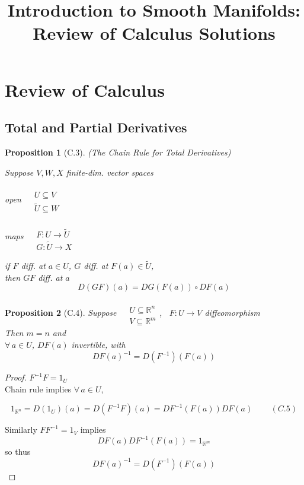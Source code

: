 \documentclass[11pt]{amsart}
\title{Introduction to Smooth Manifolds: Review of Calculus Solutions}
\newtheorem{proposition}{Proposition}
\theoremstyle{definition}
\begin{document}
\maketitle
\section{Review of Calculus}

\subsection*{Total and Partial Derivatives}

\begin{proposition}[C.3] (The Chain Rule for Total Derivatives)

Suppose $V,W,X$ finite-dim. vector spaces

open $\begin{aligned}
  & \quad \\
  & U \subseteq V \\
  & \widetilde{U} \subseteq W \end{aligned}$

maps $\begin{aligned}
  & \quad \\
  & F : U \to \widetilde{U} \\
  & G: \widetilde{U} \to X \end{aligned}$

if $F$ diff. at $a\in U$, $G$ diff. at $F(a) \in \widetilde{U}$, \\
\phantom{ \quad } then $GF$ diff. at $a$
\[
D(GF)(a) = DG(F(a)) \circ DF(a)
\]
\end{proposition}

\begin{proposition}[C.4] Suppose $\begin{aligned}
    & \quad \\
    & U \subseteq \mathbb{R}^n \\
    & V\subseteq \mathbb{R}^m \end{aligned}$, \quad \, $F: U \to V$ diffeomorphism \\
Then $m=n$ and \\
\phantom{ \quad } $\forall \, a \in U$, $DF(a)$ invertible, with
\[
DF(a)^{-1} = D(F^{-1})(F(a))
\]
\end{proposition}

\begin{proof}
$F^{-1}F = 1_U$  \\
Chain rule implies $\forall \, a \in U$,

\begin{equation}
  1_{\mathbb{R}^n} = D(1_U)(a) = D(F^{-1}F)(a) = DF^{-1}(F(a))DF(a) \quad \quad \, (C.5)
\end{equation}

Similarly $FF^{-1}=1_V$ implies
\[
DF(a)DF^{-1}(F(a)) = 1_{\mathbb{R}^m}
\]
so thus
\[
DF(a)^{-1}=D(F^{-1})(F(a))
\]
\end{proof}
\end{document}
